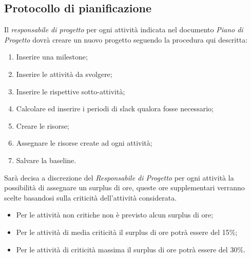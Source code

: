 \subsection{Protocollo di pianificazione}
Il \textit{responsabile di progetto} per ogni attività indicata nel documento \textit{Piano di Progetto} dovrà creare un nuovo progetto seguendo la procedura qui descritta:

\begin{enumerate}
\item Inserire una milestone;
\item Inserire le attività da svolgere;
\item Inserire le rispettive sotto-attività;
\item Calcolare ed inserire i periodi di slack qualora fosse necessario;
\item Creare le risorse;
\item Assegnare le risorse create ad ogni attività;
\item Salvare la baseline.
\end{enumerate}

Sarà decisa a discrezione del \textit{Responsabile di Progetto} per ogni attività la possibilità di assegnare un surplus di ore, queste ore supplementari verranno scelte basandosi sulla criticità dell'attività considerata.

\begin{itemize}
\item Per le attività non critiche non è previsto alcun surplus di ore;
\item Per le attività di media criticità il surplus di ore potrà essere del 15\%;
\item Per le attività di criticità massima il surplus di ore potrà essere del 30\%.
\end{itemize}
